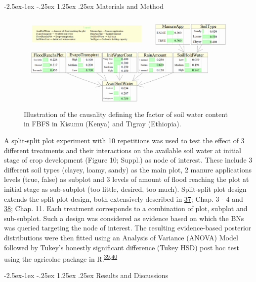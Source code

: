 \documentclass[12pt,oneside]{article}
\makeatletter
\renewcommand\paragraph{\@startsection{paragraph}{4}{\z@}%
            {-2.5ex\@plus -1ex \@minus -.25ex}%
            {1.25ex \@plus .25ex}%
            {\normalfont\normalsize\bfseries}}
\makeatother
\begin{document}
\hypertarget{materials-and-method}{%
\paragraph{Materials and Method}\label{materials-and-method}}

\begin{figure}
\includegraphics[width=1\linewidth]{figures/Modelling_FBFS_Avail_soil_water} \caption{\label{figures:figure_5}Illustration of the causality defining the factor of soil water content in FBFS in Kisumu (Kenya) and Tigray (Ethiopia).}\label{fig:figure_5}
\end{figure}

A split-split plot experiment with 10 repetitions was used to test the
effect of 3 different treatments and their interactions on the available
soil water at initial stage of crop development (Figure 10; Suppl.) as
node of interest. These include 3 different soil types (clayey, loamy,
sandy) as the main plot, 2 manure applications levels (true, false) as
subplot and 3 levels of amount of flood reaching the plot at initial
stage as sub-subplot (too little, desired, too much). Split-split plot
design extends the split plot design, both extensively described in
\protect\hyperlink{ref-Gomez_and_Gomez_1984}{37}; Chap. 3 - 4 and
\protect\hyperlink{ref-Panse_and_Sukhatme_1957}{38}; Chap. 11. Each
treatment corresponds to a combination of plot, subplot and sub-subplot.
Such a design was considered as evidence based on which the BNs was
queried targeting the node of interest. The resulting evidence-based
posterior distributions were then fitted using an Analysis of Variance
(ANOVA) Model followed by Tukey's honestly significant difference (Tukey
HSD) post hoc test using the agricolae package in
R.\textsuperscript{\protect\hyperlink{ref-DeMendiburu_2016}{39},\protect\hyperlink{ref-RCoreTeam_2018}{40}}

\hypertarget{results-and-discussions}{%
\paragraph{Results and Discussions}\label{results-and-discussions}}
\end{document}
